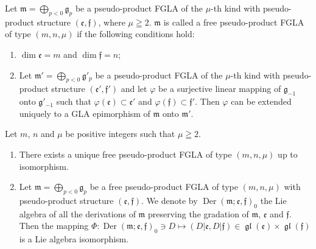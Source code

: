 \documentclass[pdftex]{sigma}
\numberwithin{equation}{section}
\numberwithin{theorem}{section}
\numberwithin{proposition}{section}
\numberwithin{lemma}{section}
\numberwithin{corollary}{section}
\numberwithin{definition}{section}
\numberwithin{example}{section}
\numberwithin{remark}{section}
\numberwithin{note}{section}
\newcommand{\gl}{\operatorname{\mathfrak{gl}}}
\newcommand{\Der}{\operatorname{Der}}
\begin{document}
Let $\mathfrak m=\bigoplus\limits_{p<0}\mathfrak g_p$ be a pseudo-product FGLA
of the $\mu$-th kind with
pseudo-product structure $(\mathfrak e,\mathfrak f)$, where $\mu\geqq2$.
$\mathfrak m$ is called a free pseudo-product FGLA
of type $(m,n,\mu)$ if the following conditions hold:
\begin{enumerate}\itemsep=0pt
\renewcommand{\labelenumi}{$(\roman{enumi})$}
\item $\dim\mathfrak e=m$ and $\dim\mathfrak f=n$;
\item Let $\mathfrak m'=\bigoplus\limits_{p<0}\mathfrak g'_p$ be a pseudo-product FGLA of the $\mu$-th kind with
pseudo-product structure $(\mathfrak e',\mathfrak f')$
and let $\varphi$ be a surjective linear mapping of $\mathfrak g_{-1}$ onto
$\mathfrak g'_{-1}$ such that
$\varphi(\mathfrak e)\subset\mathfrak e'$ and
$\varphi(\mathfrak f)\subset\mathfrak f'$.
Then $\varphi$ can be extended uniquely to a GLA
epimorphism of $\mathfrak m$ onto $\mathfrak m'$.
\end{enumerate}
\begin{proposition}\label{prop8.2} Let $m$, $n$ and $\mu$ be positive integers such that $\mu\geqq2$.
\begin{enumerate}\itemsep=0pt
\item There exists a unique free pseudo-product FGLA
of type
$(m,n,\mu)$ up to isomorphism.
\item Let $\mathfrak m=\bigoplus\limits_{p<0}\mathfrak g_p$ be a free
pseudo-product FGLA of type $(m,n,\mu)$
with pseudo-product structure $(\mathfrak e,\mathfrak f)$.
We denote by $\Der(\mathfrak m;\mathfrak e,\mathfrak f)_0$ the Lie algebra of
all the derivations of $\mathfrak m$ preserving the gradation of $\mathfrak m$, $\mathfrak e$ and $\mathfrak f$.
Then the mapping $\Phi:\Der(\mathfrak m;\mathfrak e,\mathfrak f)_0\ni D\mapsto (D|\mathfrak e,D|\mathfrak f)\in\gl(\mathfrak e)\times\gl(\mathfrak f)$ is a Lie algebra isomorphism.
\end{enumerate}
\end{proposition}
\end{document}
